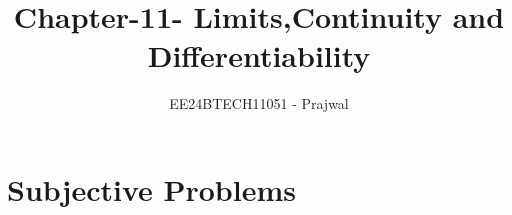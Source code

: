 \documentclass[journal,12pt,onecolumn]{IEEEtran}
\theoremstyle{remark}
\begin{document}

\vspace{3cm}

\title{Chapter-11-
        Limits,Continuity and  Differentiability}
\author{EE24BTECH11051 - Prajwal}
\maketitle
\newpage
\bigskip

\renewcommand{\thefigure}{\theenumi}
\renewcommand{\thetable}{\theenumi}


\section{Subjective Problems}
   


\begin{enumerate}


\end{enumerate}
\end{document}
